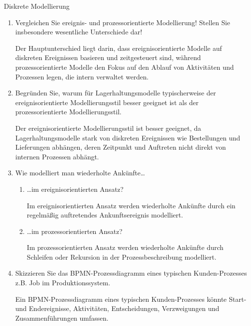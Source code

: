 \documentclass{article}
\begin{document}
\begin{exercise}{Diskrete Modellierung}
\begin{enumerate}
    \item Vergleichen Sie ereignis- und prozessorientierte Modellierung! Stellen Sie insbesondere wesentliche Unterschiede dar!
          \begin{solution}
            Der Hauptunterschied liegt darin, dass ereignisorientierte Modelle auf diskreten Ereignissen basieren und zeitgesteuert sind, während prozessorientierte Modelle den Fokus auf den Ablauf von Aktivitäten und Prozessen legen, die intern verwaltet werden.
          \end{solution}

    \item Begründen Sie, warum für Lagerhaltungsmodelle typischerweise der ereignisorientierte Modellierungsstil besser geeignet ist als der prozessorientierte Modellierungsstil.
          \begin{solution}
            Der ereignisorientierte Modellierungsstil ist besser geeignet, da Lagerhaltungsmodelle stark von diskreten Ereignissen wie Bestellungen und Lieferungen abhängen, deren Zeitpunkt und Auftreten nicht direkt von internen Prozessen abhängt.
          \end{solution}

    \item Wie modelliert man wiederholte Ankünfte…
          \begin{enumerate}
            \item …im ereignisorientierten Ansatz?
                  \begin{solution}
                    Im ereignisorientierten Ansatz werden wiederholte Ankünfte durch ein regelmäßig auftretendes Ankunftsereignis modelliert.
                  \end{solution}

            \item …im prozessorientierten Ansatz?
                  \begin{solution}
                    Im prozessorientierten Ansatz werden wiederholte Ankünfte durch Schleifen oder Rekursion in der Prozessbeschreibung modelliert.
                  \end{solution}
          \end{enumerate}

    \item Skizzieren Sie das BPMN-Prozessdiagramm eines typischen Kunden-Prozesses z.B. Job im Produktionssystem.
          \begin{solution}
            Ein BPMN-Prozessdiagramm eines typischen Kunden-Prozesses könnte Start- und Endereignisse, Aktivitäten, Entscheidungen, Verzweigungen und Zusammenführungen umfassen.
          \end{solution}


\end{enumerate}
\end{exercise}
\end{document}
